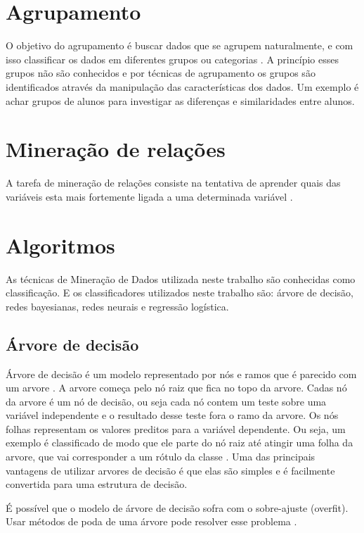 \documentclass[diss,capa]{texufpel}
\begin{document}
\section{Agrupamento}

O objetivo do agrupamento é buscar dados que se agrupem naturalmente, e com isso classificar os dados em diferentes grupos ou categorias \cite{baker2011mineraccao}. A princípio esses grupos não são conhecidos e por técnicas de agrupamento os grupos são identificados através da manipulação das características dos dados. Um exemplo é achar grupos de alunos para investigar as diferenças e similaridades entre alunos.

\section{Mineração de relações}

A tarefa de mineração de relações consiste na tentativa de aprender quais das variáveis esta mais fortemente ligada a uma determinada variável \cite{baker2010data}. 


\section{Algoritmos}

As técnicas de Mineração de Dados utilizada neste trabalho são conhecidas como classificação. E os classificadores utilizados neste trabalho são: árvore de decisão, redes bayesianas, redes neurais e regressão logística.

\subsection{Árvore de decisão}

Árvore de decisão é um modelo representado por nós e ramos que é parecido com um arvore \cite{han2011data}. A arvore começa pelo nó raiz que fica no topo da arvore. Cadas nó da arvore é um nó de decisão, ou seja cada nó contem um teste sobre uma variável independente e o resultado desse teste fora o ramo da arvore. Os nós folhas representam os valores preditos para a variável dependente. Ou seja, um exemplo é classificado de modo que ele parte do nó raiz até atingir uma folha da arvore, que vai corresponder a um rótulo da classe \cite{Romero2013}. Uma das principais vantagens de utilizar arvores de decisão é que elas são simples e é facilmente convertida para uma estrutura de decisão.

É possível que o modelo de árvore de decisão sofra com o sobre-ajuste (overfit). Usar métodos de poda de uma árvore pode resolver esse problema \cite{han2011data}. 
\end{document}
